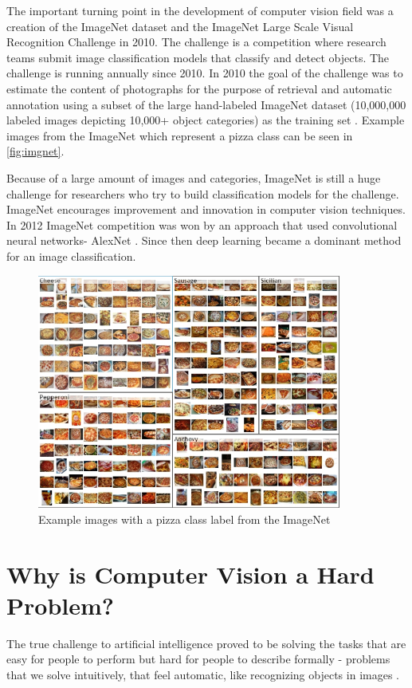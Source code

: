 The important turning point in the development of computer vision field was a creation of the ImageNet dataset and the ImageNet Large Scale Visual Recognition Challenge in 2010. The challenge is a competition where research teams submit image classification models that classify and detect objects. The challenge is running annually since 2010. In 2010 the goal of the challenge was to estimate the content of photographs for the purpose of retrieval and automatic annotation using a subset of the large hand-labeled ImageNet dataset (10,000,000 labeled images depicting 10,000+ object categories) as the training set \citep{ImageNet} . Example images  from the ImageNet which represent a pizza class can be seen in \autoref{fig:imgnet}.


Because of a  large amount of images and categories, ImageNet  is still a huge challenge for researchers who try to build classification models for the challenge.  ImageNet encourages improvement and innovation in computer vision techniques. In 2012 ImageNet competition was won by an approach that used convolutional neural networks- AlexNet \citep{alex}. Since then deep learning became a dominant method for an image classification. 


 \begin{figure}[h]
\centering
\includegraphics[width=10cm]{Figures/2/imgnet.PNG}
\caption{Example images with a pizza class label from the ImageNet }
\label{fig:imgnet}
\end{figure}


\section{Why is Computer Vision a Hard Problem?}
The true challenge to artificial intelligence proved to be solving the tasks that are easy for people to perform but hard for people to describe formally - problems that we solve intuitively, that feel automatic, like recognizing objects in images \citep{Goodfellow-et-al-2017}.

